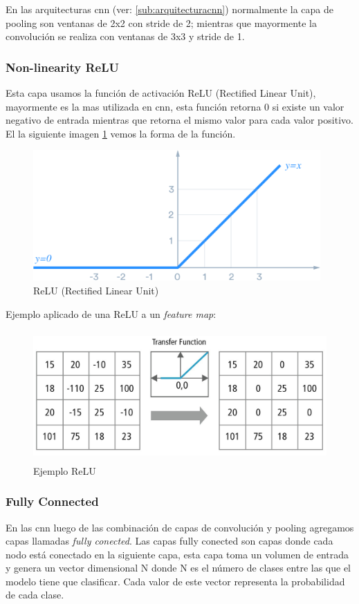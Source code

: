 En las arquitecturas \ac{cnn} (ver: \ref{sub:arquitecturacnn}) normalmente la capa de pooling son ventanas de 2x2 con stride de 2; mientras que mayormente la convolución se realiza con ventanas de 3x3 y stride de 1. 

\subsubsection{Non-linearity  ReLU}\label{sub:relu}
Esta capa usamos la función de activación ReLU (Rectified Linear Unit), mayormente es la mas utilizada en \ac{cnn}, esta función retorna 0 si existe un valor negativo de entrada mientras que retorna el mismo valor para cada valor positivo. El la siguiente imagen \ref{Fig:relu} vemos la forma de la función.

\begin{figure}[H]
 \centering
  \includegraphics[height=5cm,keepaspectratio=true,clip=true]{imagenes/MarcoTeorico/ReLU_1.png}
  \caption{ReLU (Rectified Linear Unit)} \label{Fig:relu}
\end{figure}

Ejemplo aplicado de una ReLU a un \textit{feature map}:
\begin{figure}[H]
 \centering
  \includegraphics[height=5cm,keepaspectratio=true,clip=true]{imagenes/MarcoTeorico/ReLU_2.jpeg}
  \caption{Ejemplo ReLU } \label{Fig:relu2}
\end{figure}



\subsubsection{Fully Connected}\label{sub:fully_connected}
En las \ac{cnn} luego de las combinación de capas de convolución y pooling agregamos capas llamadas \textit{fully conected}. Las capas fully conected son capas donde cada nodo  está conectado en la siguiente capa, esta capa toma un volumen de entrada y genera un vector dimensional N donde N es el número de clases entre las que el modelo tiene que clasificar. Cada valor de este vector representa la probabilidad de cada clase.

